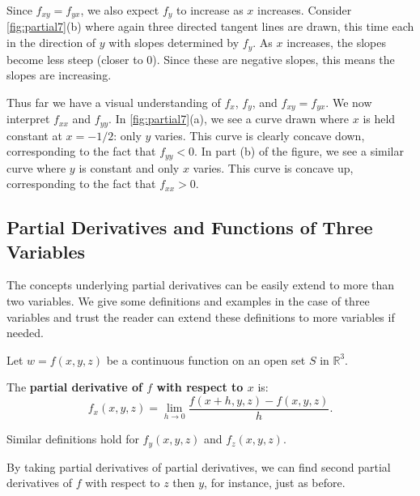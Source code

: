 {Since $f_{xy}=f_{yx}$, we also expect $f_y$ to increase as $x$ increases. Consider \autoref{fig:partial7}(b) where again three directed tangent lines are drawn, this time each in the direction of $y$ with slopes determined by $f_y$. As $x$ increases, the slopes become less steep (closer to 0). Since these are negative slopes, this means the slopes are increasing.

Thus far we have a visual understanding of $f_x$, $f_y$, and $f_{xy}=f_{yx}$. We now interpret $f_{xx}$ and $f_{yy}$. In \autoref{fig:partial7}(a), we see a curve drawn where $x$ is held constant at $x=-1/2$: only $y$ varies. This curve is clearly concave down, corresponding to the fact that $f_{yy}<0$. In part (b) of the figure, we see a similar curve where $y$ is constant and only $x$ varies. This curve is concave up, corresponding to the fact that $f_{xx}>0$.}

\subsection*{Partial Derivatives and Functions of Three Variables}

The concepts underlying partial derivatives can be easily extend to more than two variables. We give some definitions and examples in the case of three variables and trust the reader can extend these definitions to more variables if needed.

{Let $w=f(x,y,z)$ be a continuous function on an open set $S$ in $\mathbb{R}^3$. 

The \textbf{partial derivative of $f$ with respect to $x$} is:
	$$f_x(x,y,z) = \lim_{h\to 0} \frac{f(x+h,y,z)-f(x,y,z)}{h}.$$
	
	Similar definitions hold for $f_y(x,y,z)$ and $f_z(x,y,z)$.
}

By taking partial derivatives of partial derivatives, we can find second partial derivatives of $f$ with respect to $z$ then $y$, for instance, just as before.\\

